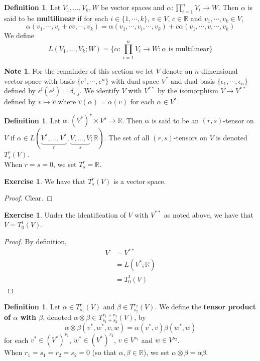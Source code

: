 \documentclass{book}
\theoremstyle{definition}
\newtheorem{defn}[definition]{Definition}
\newtheorem{note}[definition]{Note}
\newtheorem{ex}[definition]{Exercise}
\newcommand{\al}{\alpha}
\newcommand{\be}{\beta}
\newcommand{\del}{\delta}
\newcommand{\ep}{\epsilon}
\newcommand{\R}{\mathbb{R}}
\DeclareMathOperator*{\0}{\mbf{0}}
\DeclareMathOperator*{\1}{\mbf{1}}
\newcommand{\tbf}[1]{\textbf{#1}}
\newcommand{\Tn}[1]{T^{r_{#1}}_{s_{#1}}(V)}
\begin{document}
	\begin{defn}
	Let $V_1, \dots, V_k, W$ be vector spaces and $\al : \prod_{i=1}^n V_i \rightarrow W$. Then $\al$ is said to be \tbf{multilinear} if for each $i \in \{1, \cdots, k\}$, $v \in V$, $c \in \R$ and $v_1, \cdots, v_k \in V$, $$\al(v_1, \cdots, v_i + cv, \cdots, v_k) = \al(v_1, \cdots, v_i, \cdots, v_k) + c\al(v_1, \cdots, v, \cdots, v_k)$$
	We define $$L(V_1, \dots, V_k; W) = \bigg \{\al : \prod_{i=1}^n V_i \rightarrow W: \al \text{ is multilinear} \bigg\}$$ 
	\end{defn}	
	
	\begin{note}
		For the remainder of this section we let $V$ denote an $n$-dimensional vector space with basis $\{e^1, \cdots, e^n\}$ with dual space $V^*$ and dual basis $\{\ep_1, \cdots, \ep_n\}$ defined by $\ep^i(e^j) = \del_{i,j}$. We identify $V$ with $V^{**}$ by the isomorphism $V \rightarrow V^{**}$ defined by $v \mapsto \hat{v}$ where $\hat{v}(\al) = \al(v)$ for each $\al \in V^*$. 
	\end{note}	
	
	\begin{defn}
	Let $\al: (V^*)^r \times V^s \rightarrow \R$. Then $\al$ is said to be an $(r,s)$-tensor on $V$ if $\al \in L(\underbrace{V^*, \dots, V^*}_{r}, \underbrace{V, \dots, V}_{s}; \R)$. The set of all $(r,s)$-tensors on $V$ is denoted $T^r_s(V)$. \\
	When $r=s=0$, we set $T^r_s = \R$.
	\end{defn}
	
	\begin{ex}
		We have that $T^r_s(V)$ is a vector space. 
	\end{ex}

	\begin{proof}
		Clear.
	\end{proof}
	
	\begin{ex}
	Under the identification of $V$ with $V^{**}$ as noted above, we have that $V = T^1_0(V)$. 
	\end{ex}
	
	\begin{proof}
	By definition,
	\begin{align*}
	V 
	&= V^{**} \\
	&= L(V^*; \R) \\
	&= T^1_0(V)
	\end{align*}
	\end{proof}
	
	\begin{defn}
	Let $\al \in \Tn{1}$ and $\be \in \Tn{2}$. We define the \tbf{tensor product of $\al$ with $\be$}, denoted $\al \otimes \be \in T^{r_1+r_2}_{s_1+s_2}(V)$, by $$\al \otimes \be (v^*, w^*, v, w) = \al(v^*, v) \be(w^*, w)$$ for each $v^* \in (V^*)^{r_1}$, $w^* \in (V^*)^{r_2}$, $v \in V^{s_1}$ and $w \in V^{s_2}$.\\
	When $r_1=s_1=r_2=s_2= 0$ (so that $\al, \be \in \R$), we set $\al \otimes \be = \al \be$.
	\end{defn}
	
\end{document}
